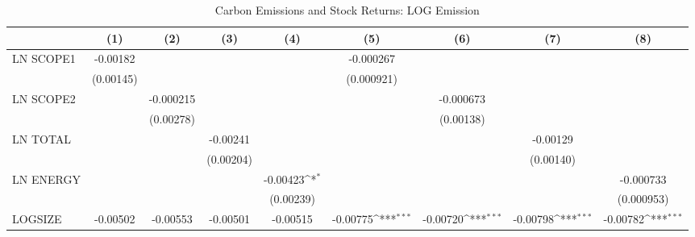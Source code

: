 \begin{table}[htbp]\centering
\def\sym#1{\ifmmode^{#1}\else\(^{#1}\)\fi}
\caption{Carbon Emissions and Stock Returns: LOG Emission}
\begin{tabular}{l*{8}{c}}
\hline\hline
                    &\multicolumn{1}{c}{(1)}         &\multicolumn{1}{c}{(2)}         &\multicolumn{1}{c}{(3)}         &\multicolumn{1}{c}{(4)}         &\multicolumn{1}{c}{(5)}         &\multicolumn{1}{c}{(6)}         &\multicolumn{1}{c}{(7)}         &\multicolumn{1}{c}{(8)}         \\
\hline
LN SCOPE1           &    -0.00182         &                     &                     &                     &   -0.000267         &                     &                     &                     \\
                    &   (0.00145)         &                     &                     &                     &  (0.000921)         &                     &                     &                     \\
LN SCOPE2           &                     &   -0.000215         &                     &                     &                     &   -0.000673         &                     &                     \\
                    &                     &   (0.00278)         &                     &                     &                     &   (0.00138)         &                     &                     \\
LN TOTAL            &                     &                     &    -0.00241         &                     &                     &                     &    -0.00129         &                     \\
                    &                     &                     &   (0.00204)         &                     &                     &                     &   (0.00140)         &                     \\
LN ENERGY           &                     &                     &                     &    -0.00423\sym{*}  &                     &                     &                     &   -0.000733         \\
                    &                     &                     &                     &   (0.00239)         &                     &                     &                     &  (0.000953)         \\
LOGSIZE             &    -0.00502         &    -0.00553         &    -0.00501         &    -0.00515         &    -0.00775\sym{***}&    -0.00720\sym{***}&    -0.00798\sym{***}&    -0.00782\sym{***}\\

\end{tabular}
\end{table}
